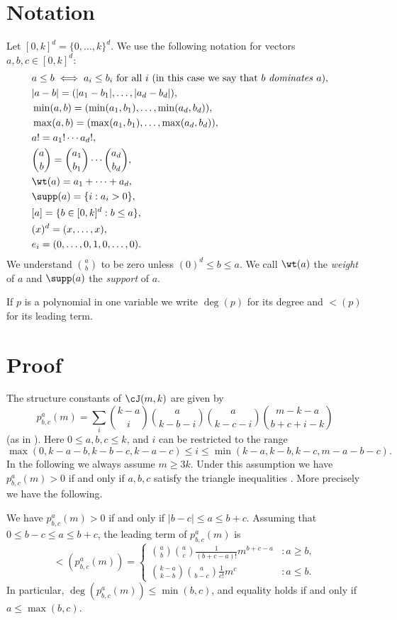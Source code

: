 \section{Notation}

Let $[0,k]^d = \{0,\dots,k\}^d$.
We use the following notation for vectors $a,b,c \in [0,k]^d$:
\begin{align*}
    &a \leq b \iff a_i \leq b_i ~ \text{for all} ~ i ~ {(\text{in this case we say that } b ~ \text{\emph{dominates}} ~ a)}, &\\
    &|a - b| = (|a_1 - b_1|, \dots, |a_d - b_d|),\\
    &\min(a, b) = (\min(a_1, b_1), \dots, \min(a_d, b_d)),\\
    &\max(a, b) = (\max(a_1, b_1), \dots, \max(a_d, b_d)),\\
    &a! = a_1! \cdots a_d!,\\
    &\binom{a}{b} = \binom{a_1}{b_1} \cdots \binom{a_d}{b_d},\\
    &\wt(a) = a_1 + \cdots + a_d, \\
    &\supp(a) = \{ i : a_i > 0\}, \\
    &[a] = \{ b \in [0,k]^d : b \leq a\}, \\
    &(x)^d = (x, \dots, x), \\
    &e_i = (0, \dots, 0, 1, 0, \dots, 0).
\end{align*}
We understand $\binom{a}{b}$ to be zero unless $(0)^d \le b \le a$.
We call $\wt(a)$ the \emph{weight} of $a$ and $\supp(a)$ the \emph{support} of $a$.

If $p$ is a polynomial in one variable we write $\deg(p)$ for its degree and $\lt(p)$ for its leading term.

\section{Proof}

The structure constants of $\cJ(m,k)$ are given by
\[
    p_{b,c}^a(m) = \sum_{i} \binom{k-a}{i}\binom{a}{k-b-i}\binom{a}{k-c-i} \binom{m-k-a}{b+c+i-k}
\]
(as in \cite{E,KK}).
Here $0 \leq a, b, c \leq k$, and $i$ can be restricted to the range
\[
    \max(0,k-a-b,k-b-c,k-a-c) \leq i \leq \min(k-a,k-b,k-c, m-a-b-c).
\]
In the following we always assume $m \geq 3k$. Under this assumption we have $p_{b,c}^a(m) > 0$ if and only if $a,b,c$ satisfy the triangle inequalities \cite[Lemma~4.1]{E}.
More precisely we have the following.

\begin{lemma}
    We have $p^a_{b, c}(m) > 0$ if and only if $|b - c| \leq a \leq b + c$. 
    Assuming that~$0 \leq b - c \leq a \leq b + c$, the leading term of $p^a_{b,c}(m)$ is
    \[
        \lt(p_{b,c}^a(m)) = \begin{cases}
        \binom{a}{b}\binom{a}{c}\frac{1}{(b+c - a)!} m^{b+c-a} &: a \geq b,\\
        \binom{k-a}{k-b}\binom{a}{b-c}\frac{1}{c!} m^{c} &: a\leq b.
        \end{cases}
    \]
In particular, $\deg(p_{b,c}^a(m))\leq \min(b,c)$, and equality holds if and only if $a \leq \max(b,c)$.
\end{lemma}

